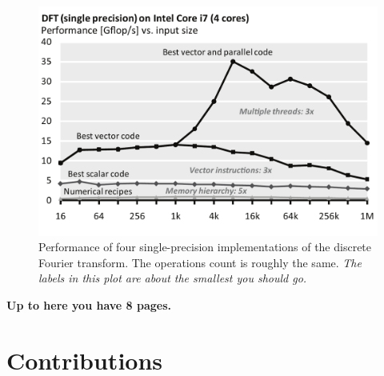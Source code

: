 \documentclass[letterpaper]{article}
\begin{document}
\begin{figure}\centering
  \includegraphics[scale=0.33]{img/dft-performance.pdf}
  \caption{Performance of four single-precision implementations of the
  discrete Fourier transform. The operations count is roughly the
  same. {\em The labels in this plot are about the smallest you should go.}\label{fftperf}}
\end{figure}

\bigskip
{\bf Up to here you have 8 pages.}

\section{Contributions}%


\end{document}
